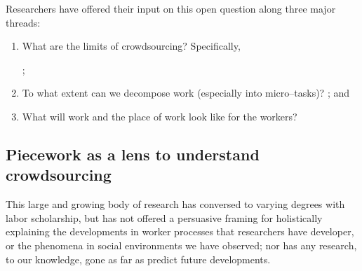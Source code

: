 \documentclass[trackingWork]{subfiles}
\begin{document}
Researchers have offered their input on this open question along three major threads:
\begin{enumerate}
  \item What are the limits of crowdsourcing?
        Specifically,
        \cite{foundry,suzukiAtelier,KimStoria,yuanAlmost,YuEncouragingOutside,
              Nebeling:2016:WCW:2858036.2858169,
              Hahn:2016:KAB:2858036.2858364};
  \item To what extent can we decompose work (especially into micro--tasks)? 
        \cite{embracingErrorKrishna,bernsteinSoylent,sensitiveTasks,
              LykourentzouPersonalityMatters,KucherbaevReLauncher,
              Law:2016:CKC:2858036.2858144,Cai:2016:CRI:2858036.2858237,
              Chang:2016:ACC:2858036.2858411,Newell:2016:OMA:2858036.2858490}; and%
  \item What will work and the place of work look like for the workers?
        \cite{turkopticon,storiesIraniSilberman,dynamo,crowdcollab,
              whyWouldAnyoneBrewer,takingAHITMcInnis}
\end{enumerate}


\subsection{Piecework as a lens to understand crowdsourcing}
This large and growing body of research has conversed
to varying degrees with labor scholarship,
but has not offered a persuasive framing for holistically explaining
the developments in worker processes that researchers have developer, or
the phenomena in social environments we have observed;
nor has any research, to our knowledge,
gone as far as predict future developments.
\end{document}
